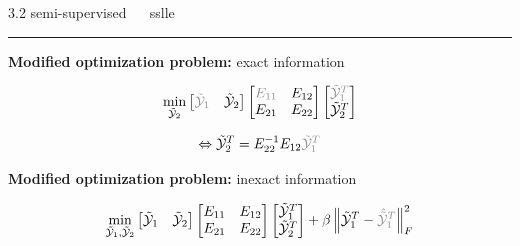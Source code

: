 \documentclass[11pt, compress, t, notes = noshow, xcolor = table, 
aspectratio = 1610]{beamer}
\newcommand{\Y}{\mathcal{Y}}
\newcommand{\Ytil}{\tilde{\Y}}
\newcommand{\frobnorm}[1]{\left\lVert #1 \right\rVert^2_F}
\begin{document}
\LARGE
\begin{frame}{\textcolor{gray!90}{3.2 semi-supervised} ~~ sslle}
\normalsize
\vspace{-0.5cm}
\noindent \textcolor{gray!90}{\rule{\textwidth}{1pt}}
\smallskip

\textbf{Modified optimization problem:} exact information 

\begin{fleqn}
  \begin{equation}
    \min_{\Ytil_2}
    \begin{bmatrix} \textcolor{gray!90}{\Ytil_1} & \Ytil_2 \end{bmatrix}
    \begin{bmatrix} \textcolor{gray!90}{E_{11}} & E_{12} \\ E_{21} & E_{22} 
    \end{bmatrix}
    \begin{bmatrix} \textcolor{gray!90}{\Ytil_1^T} \\ \Ytil_2^T \end{bmatrix}
  \end{equation}
\end{fleqn}

\begin{fleqn}
  \begin{equation}
    \Leftrightarrow \Ytil_2^T = E_{22}^{-1} E_{12} 
    \textcolor{gray!90}{\Ytil_1^T}
  \end{equation}
\end{fleqn}

\textbf{Modified optimization problem:} inexact information 

\begin{fleqn}
  \begin{equation}
    \min_{\Ytil_1, \Ytil_2}
    \begin{bmatrix} \Ytil_1 & \Ytil_2 \end{bmatrix}
    \begin{bmatrix} E_{11} & E_{12} \\ E_{21} & E_{22} \end{bmatrix}
    \begin{bmatrix} \Ytil_1^T \\ \Ytil_2^T \end{bmatrix} +
    \beta \frobnorm{\Ytil_1^T - \textcolor{gray!90}{\hat{\Ytil}_1^T}}
  \end{equation}
\end{fleqn}


\end{frame}
\end{document}
